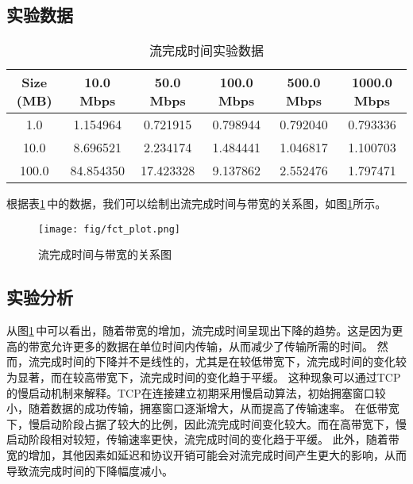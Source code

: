 \documentclass[11pt]{article}
\begin{document}
\subsection{实验数据}
\begin{table}[H]
  \centering
  \caption{流完成时间实验数据}
  \label{tab:fct_data}
  \begin{tabular}{cccccc}
    \toprule
    \textbf{Size (MB)} & \textbf{10.0 Mbps} & \textbf{50.0 Mbps} & \textbf{100.0 Mbps} & \textbf{500.0 Mbps} & \textbf{1000.0 Mbps} \\
    \midrule
    1.0  & 1.154964 & 0.721915 & 0.798944 & 0.792040 & 0.793336 \\
    10.0 & 8.696521 & 2.234174 & 1.484441 & 1.046817 & 1.100703 \\
    100.0 & 84.854350 & 17.423328 & 9.137862 & 2.552476 & 1.797471 \\
    \bottomrule
  \end{tabular}
\end{table}

根据表\ref{tab:fct_data}\,中的数据，我们可以绘制出流完成时间与带宽的关系图，如图\ref{fig:fct_plot}所示。
\begin{figure}[H]
  \centering
  \texttt{[image: fig/fct\_plot.png]}
  \caption{流完成时间与带宽的关系图}
  \label{fig:fct_plot}
\end{figure}

\subsection{实验分析}
从图\ref{fig:fct_plot}\,中可以看出，随着带宽的增加，流完成时间呈现出下降的趋势。这是因为更高的带宽允许更多的数据在单位时间内传输，从而减少了传输所需的时间。
然而，流完成时间的下降并不是线性的，尤其是在较低带宽下，流完成时间的变化较为显著，而在较高带宽下，流完成时间的变化趋于平缓。
这种现象可以通过TCP的慢启动机制来解释。TCP在连接建立初期采用慢启动算法，初始拥塞窗口较小，随着数据的成功传输，拥塞窗口逐渐增大，从而提高了传输速率。
在低带宽下，慢启动阶段占据了较大的比例，因此流完成时间变化较大。而在高带宽下，慢启动阶段相对较短，传输速率更快，流完成时间的变化趋于平缓。
此外，随着带宽的增加，其他因素如延迟和协议开销可能会对流完成时间产生更大的影响，从而导致流完成时间的下降幅度减小。
\end{document}
